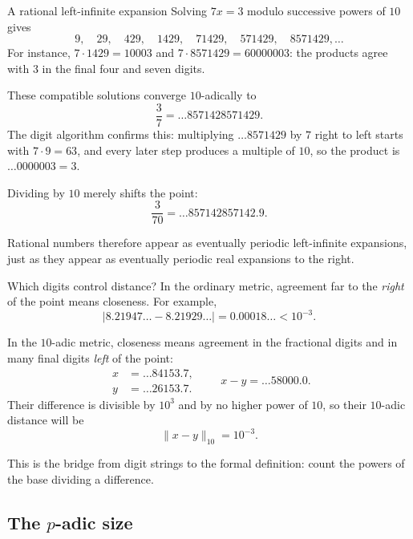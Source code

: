 \documentclass[aspectratio=169,11pt]{beamer}
\begin{document}
\begin{frame}{A rational left-infinite expansion}
  \small
  Solving \(7x=3\) modulo successive powers of \(10\) gives
  \[
    9,\quad29,\quad429,\quad1429,\quad71429,\quad571429,\quad8571429,\ldots
  \]
  For instance, \(7\cdot1429=10003\) and \(7\cdot8571429=60000003\): the
  products agree with \(3\) in the final four and seven digits.

  These compatible solutions converge \(10\)-adically to
  \[
    \boxed{\frac37=\ldots8571428571429.}
  \]
  The digit algorithm confirms this: multiplying \(\ldots8571429\) by \(7\)
  right to left starts with \(7\cdot9=63\), and every later step produces a
  multiple of \(10\), so the product is \(\ldots0000003=3\).

  Dividing by \(10\) merely shifts the point:
  \[
    \frac3{70}=\ldots857142857142.9.
  \]

  Rational numbers therefore appear as eventually periodic left-infinite
  expansions, just as they appear as eventually periodic real expansions to
  the right.
\end{frame}

\begin{frame}{Which digits control distance?}
  In the ordinary metric, agreement far to the \emph{right} of the point
  means closeness.  For example,
  \[
    |8.21947\ldots-8.21929\ldots|
      =0.00018\ldots<10^{-3}.
  \]

  In the \(10\)-adic metric, closeness means agreement in the fractional
  digits and in many final digits \emph{left} of the point:
  \[
    \begin{aligned}
      x&=\ldots84153.7,\\
      y&=\ldots26153.7.
    \end{aligned}
    \qquad
    x-y=\ldots58000.0.
  \]
  Their difference is divisible by \(10^3\) and by no higher power of
  \(10\), so their \(10\)-adic distance will be
  \[
    \|x-y\|_{10}=10^{-3}.
  \]

  This is the bridge from digit strings to the formal definition: count the
  powers of the base dividing a difference.
\end{frame}

\subsection{\texorpdfstring{The \(p\)-adic size}{The p-adic size}}
\end{document}
